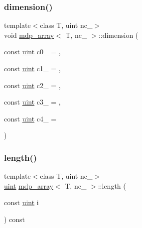 \mbox{\label{classmdp__array_a816b392dd8ab232c18818e6f186127aa}} 
\subsubsection{\texorpdfstring{dimension()}{dimension()}\hspace{0.1cm}{\footnotesize\ttfamily [2/2]}}
{\footnotesize\ttfamily template$<$class T, uint nc\+\_\+$>$ \\
void \hyperlink{classmdp__array}{mdp\+\_\+array}$<$ T, nc\+\_\+ $>$\+::dimension (\begin{DoxyParamCaption}\item[{const \hyperlink{mdp__global__vars_8h_a91ad9478d81a7aaf2593e8d9c3d06a14}{uint}}]{c0\+\_\+ = {},  }\item[{const \hyperlink{mdp__global__vars_8h_a91ad9478d81a7aaf2593e8d9c3d06a14}{uint}}]{c1\+\_\+ = {},  }\item[{const \hyperlink{mdp__global__vars_8h_a91ad9478d81a7aaf2593e8d9c3d06a14}{uint}}]{c2\+\_\+ = {},  }\item[{const \hyperlink{mdp__global__vars_8h_a91ad9478d81a7aaf2593e8d9c3d06a14}{uint}}]{c3\+\_\+ = {},  }\item[{const \hyperlink{mdp__global__vars_8h_a91ad9478d81a7aaf2593e8d9c3d06a14}{uint}}]{c4\+\_\+ = {} }\end{DoxyParamCaption})\hspace{0.3cm}{\ttfamily [inline]}}

\mbox{\label{classmdp__array_a6a548619f489cfb3d86d06d6e7100050}} 
\subsubsection{\texorpdfstring{length()}{length()}\hspace{0.1cm}{\footnotesize\ttfamily [1/2]}}
{\footnotesize\ttfamily template$<$class T, uint nc\+\_\+$>$ \\
\hyperlink{mdp__global__vars_8h_a91ad9478d81a7aaf2593e8d9c3d06a14}{uint} \hyperlink{classmdp__array}{mdp\+\_\+array}$<$ T, nc\+\_\+ $>$\+::length (\begin{DoxyParamCaption}\item[{const \hyperlink{mdp__global__vars_8h_a91ad9478d81a7aaf2593e8d9c3d06a14}{uint}}]{i }\end{DoxyParamCaption}) const\hspace{0.3cm}{\ttfamily [inline]}}

